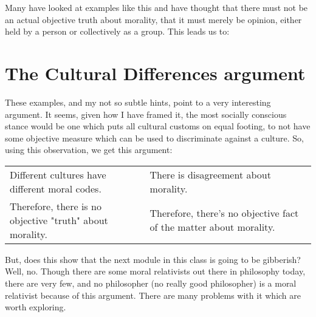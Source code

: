 
Many have looked at examples like this and have thought that there must not be an actual objective truth about morality, that it must merely be opinion, either held by a person or collectively as a group. This leads us to:

\section{The Cultural Differences argument}

These examples, and my not so subtle  hints, point to a very interesting argument. It seems, given how I have framed it, the most socially conscious stance would be one which puts all cultural customs on equal footing, to not have some objective measure which can be used to discriminate against a culture. So, using this observation, we get this argument:

\begin{tabular}{p{2in}|p{2in}}
    Different cultures have different moral codes.&There is disagreement about morality.\\
    Therefore, there is no objective "truth" about morality.&Therefore, there's no objective fact of the matter about morality.
\end{tabular}

But, does this show that the next module in this class is going to be gibberish? Well, no. Though there are some moral relativists out there in philosophy today, there are very few, and no philosopher (no really good philosopher) is a moral relativist because of this argument. There are many problems with it which are worth exploring. 

